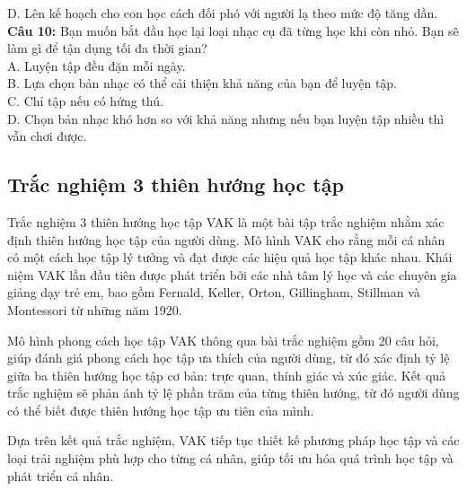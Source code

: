 \begin{multicols}{2}
D. Lên kế hoạch cho con học cách đối phó với người lạ theo mức độ tăng dần. \\
\textbf{Câu 10:} Bạn muốn bắt đầu học lại loại nhạc cụ đã từng học khi còn nhỏ. Bạn sẽ làm gì để tận dụng tối đa thời gian? \\
A. Luyện tập đều đặn mỗi ngày. \\
B. Lựa chọn bản nhạc có thể cải thiện khả năng của bạn để luyện tập. \\
C. Chỉ tập nếu có hứng thú. \\
D. Chọn bản nhạc khó hơn so với khả năng nhưng nếu bạn luyện tập nhiều thì vẫn chơi được. \\
\end{multicols}

\subsection{Trắc nghiệm 3 thiên hướng học tập}

Trắc nghiệm 3 thiên hướng học tập VAK là một bài tập trắc nghiệm nhằm xác định thiên hướng học tập của người dùng. Mô hình VAK cho rằng mỗi cá nhân có một cách học tập lý tưởng và đạt được các hiệu quả học tập khác nhau. Khái niệm VAK lần đầu tiên được phát triển bởi các nhà tâm lý học và các chuyên gia giảng dạy trẻ em, bao gồm Fernald, Keller, Orton, Gillingham, Stillman và Montessori từ những năm 1920.

Mô hình phong cách học tập VAK thông qua bài trắc nghiệm gồm 20 câu hỏi, giúp đánh giá phong cách học tập ưa thích của người dùng, từ đó xác định tỷ lệ giữa ba thiên hướng học tập cơ bản: trực quan, thính giác và xúc giác. Kết quả trắc nghiệm sẽ phản ánh tỷ lệ phần trăm của từng thiên hướng, từ đó người dùng có thể biết được thiên hướng học tập ưu tiên của mình.

Dựa trên kết quả trắc nghiệm, VAK tiếp tục thiết kế phương pháp học tập và các loại trải nghiệm phù hợp cho từng cá nhân, giúp tối ưu hóa quá trình học tập và phát triển cá nhân.

